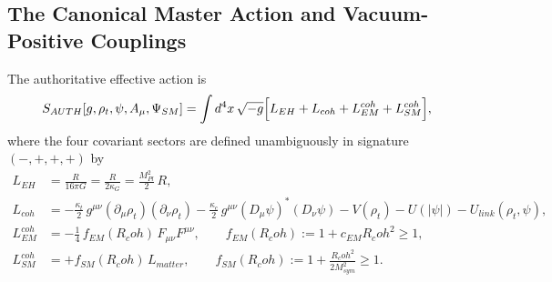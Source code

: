 \documentclass[american,11pt,letterpaper]{article}
\newcommand{\Rcoh}{R_{\mathrm{coh}}}
\def\mathcal#1{#1}%
\def\mathrm#1{#1}%
\def\Rcoh{R_coh}%
\begin{document}
\subsection{The Canonical Master Action and Vacuum-Positive Couplings}

The authoritative effective action is
\begin{equation}
S_{\mathrm{AUTH}}[g,\rho_t,\psi,A_\mu,\Psi_{\mathrm{SM}}]
= \int d^4x\,\sqrt{-g}\Bigl[
  \mathcal{L}_{\mathrm{EH}}
  + \mathcal{L}_{\mathrm{coh}}
  + \mathcal{L}_{\mathrm{EM}}^{\mathrm{coh}}
  + \mathcal{L}_{\mathrm{SM}}^{\mathrm{coh}}
\Bigr],
\label{eq:canonical_action_sec5}
\end{equation}
where the four covariant sectors are defined unambiguously in signature $(-,+,+,+)$ by
\begin{align}
\mathcal{L}_{\mathrm{EH}} &= \frac{R}{16\pi G} = \frac{R}{2\kappa_G} = \frac{M_{\mathrm{Pl}}^2}{2}\,R, \label{eq:L_EH_def}\\
\mathcal{L}_{\mathrm{coh}} &= -\frac{\kappa_t}{2}\,g^{\mu\nu}(\partial_\mu\rho_t)(\partial_\nu\rho_t)
  - \frac{\kappa_c}{2}\,g^{\mu\nu}(D_\mu\psi)^*(D_\nu\psi)
  - V(\rho_t) - U(|\psi|) - U_{\mathrm{link}}(\rho_t,\psi), \label{eq:L_coh_def}\\
\mathcal{L}_{\mathrm{EM}}^{\mathrm{coh}} &= -\frac{1}{4}\,f_{\mathrm{EM}}(\Rcoh)\,F_{\mu\nu}F^{\mu\nu},
  \qquad f_{\mathrm{EM}}(\Rcoh) := 1 + c_{\mathrm{EM}}\Rcoh^2 \ge 1, \label{eq:L_EM_def}\\
\mathcal{L}_{\mathrm{SM}}^{\mathrm{coh}} &= +f_{\mathrm{SM}}(\Rcoh)\,\mathcal{L}_{\mathrm{matter}},
  \qquad f_{\mathrm{SM}}(\Rcoh) := 1 + \frac{\Rcoh^2}{2 M_{\mathrm{sym}}^2} \ge 1. \label{eq:L_SM_def}
\end{align}
\end{document}
